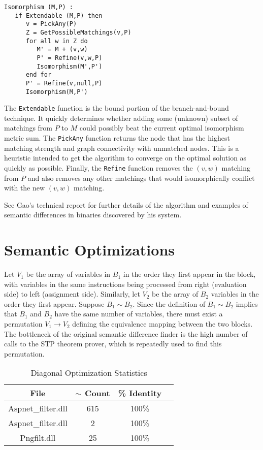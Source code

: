 \documentclass[11pt,twocolumn]{article}
\begin{document}
\begin{verbatim}
Isomorphism (M,P) :
   if Extendable (M,P) then
      v = PickAny(P)
      Z = GetPossibleMatchings(v,P)
      for all w in Z do
         M' = M + (v,w)
         P' = Refine(v,w,P)
         Isomorphism(M',P')
      end for
      P' = Refine(v,null,P)
      Isomorphism(M,P')
\end{verbatim}

The \texttt{Extendable} function is the bound portion of the branch-and-bound technique.  It quickly determines whether adding some (unknown) subset of matchings from $P$ to $M$ could possibly beat the current optimal isomorphism metric sum.  The \texttt {PickAny} function returns the node that has the highest matching strength and graph connectivity with unmatched nodes.  This is a heuristic intended to get the algorithm to converge on the optimal solution as quickly as possible.  Finally, the \texttt{Refine} function removes the $(v,w)$ matching from $P$ and also removes any other matchings that would isomorphically conflict with the new $(v,w)$ matching.  

See Gao's technical report \cite{sdibe} for further details of the algorithm and examples of semantic differences in binaries discovered by his system. 

\section{Semantic Optimizations}

Let $V_1$ be the array of variables in $B_1$ in the order they first appear in the block, with variables in the same instructions being processed from right (evaluation side) to left (assignment side).  
Similarly, let $V_2$ be the array of $B_2$ variables in the order they first appear. 
Suppose $B_1 \sim B_2$.  Since the definition of $B_1 \sim B_2$ implies that $B_1$ and $B_2$ have the same number of variables, there must exist a permutation  $V_1 \rightarrow  V_2$ defining the equivalence mapping between the two blocks.  The bottleneck of the original semantic difference finder is the high number of calls to the STP theorem prover, which is repeatedly used to find this permutation.

\begin{table}[t]
\caption{Diagonal Optimization Statistics}
\centering
\begin{tabular}{ c c c c }
\hline \hline
File &  $\sim$ Count &  \% Identity \\
\hline
{\small Aspnet\_filter.dll}& 615 & 100\% \\
{\small Aspnet\_filter.dll}\footnotemark[1]  & 2 & 100\% \\
{\small Pngfilt.dll}\footnotemark[1]  & 25 &  100\% \\
\end{tabular}
\end{table}
\end{document}
